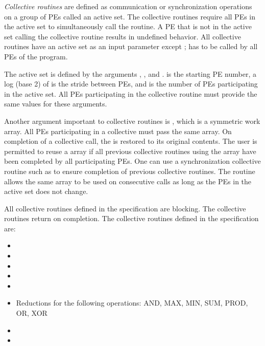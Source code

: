 \emph{Collective routines} are defined as communication or synchronization
operations on a group of \acp{PE} called an active set. The collective
routines require all \acp{PE} in the active set to simultaneously call the
routine.  A \ac{PE} that is not in the active set calling the collective
routine results in undefined behavior.  All collective routines have an
active set as an input parameter except ;
 has to be called by all \acp{PE} of the
\openshmem program. 

The active set is defined by the arguments , ,
and .   is the starting \ac{PE} number, a log (base
2) of  is the stride between \acp{PE}, and  is
the number of \acp{PE} participating in the active set.  All \acp{PE}
participating in the collective routine must provide the same values for these
arguments. 
 
Another argument important to collective routines is , which is a
symmetric work array.  All \acp{PE} participating in a collective must pass the
same  array.  On completion of a collective call, the  is
restored to its original contents.  The user is permitted to reuse a 
array if all previous collective routines using the  array have been
completed by all participating \acp{PE}.  One can use a synchronization
collective routine such as  to ensure completion of previous collective
routines. The  routine allows the same  array to
be used on consecutive calls as long as the \acp{PE} in the active set does not change. 

All collective routines defined in the specification are blocking.  The
collective routines return on completion.  The collective routines defined in
the \openshmem specification are:

\begin{itemize}
\item {}
\item {}
\item {}
\item {}
\item {}
\item Reductions for the following operations: AND, MAX, MIN, SUM, PROD, OR, XOR
\item {}
\item {}
\end{itemize}
